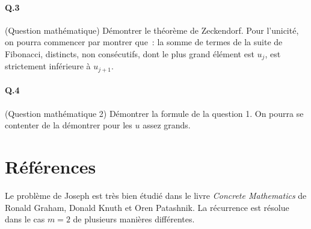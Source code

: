 \documentclass[10pt,a4paper]{article}
\begin{document}
\paragraph{Q.3} (Question mathématique) Démontrer le théorème de Zeckendorf. Pour l'unicité, on pourra commencer par montrer que~: la somme de termes de la suite de Fibonacci, distincts, non consécutifs, dont le plus grand élément est $u_j$, est strictement inférieure à $u_{j+1}$.

\paragraph{Q.4} (Question mathématique 2) Démontrer la formule de la question 1. On pourra se contenter de la démontrer pour les $u$ assez grands.

\section{Références}
Le problème de Joseph est très bien étudié dans le livre \emph{Concrete Mathematics} de Ronald Graham, Donald Knuth et Oren Patashnik. La récurrence est résolue dans le cas $m=2$ de plusieurs manières différentes.
\end{document}
